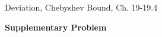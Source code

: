 \documentclass[handout]{mcs}
\begin{document}

\begin{staffnotes}
Deviation, Chebyshev Bound, Ch. 19-19.4
\end{staffnotes}



\begin{center}
\textbf{Supplementary Problem}
\end{center}





\end{document}
